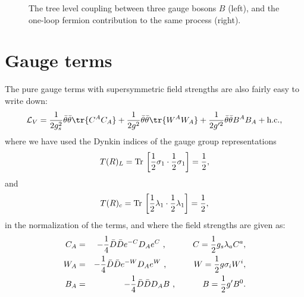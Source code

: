 \documentclass[notes.tex]{subfiles}
\begin{document}

\begin{figure}[h]
\centering
{}
\caption{The tree level coupling between three gauge bosons $B$ (left), and the one-loop fermion contribution to the same process (right).}  
\label{fig:anomaly}
\end{figure}



\section{Gauge terms}
The pure gauge terms with supersymmetric field strengths are also fairly easy to write down:
\begin{eqnarray}\label{eq:gaugelag}
\mathcal{L}_V = \frac{1}{2g_s^2}\bar{\theta}\bar{\theta}\tr{C^AC_A} +\frac{1}{2g^2}\bar{\theta}\bar{\theta}\tr{W^AW_A} +  \frac{1}{2g'^2}\bar{\theta}\bar{\theta}B^AB_A+\text{h.c.},
\end{eqnarray}
where we have used the Dynkin indices of the gauge group representations
\[T(R)_L = {\rm Tr\,}\left[\frac{1}{2}\sigma_1\cdot \frac{1}{2}\sigma_1\right] = \frac{1}{2},\]
and
\[T(R)_c = {\rm Tr\,}\left[\frac{1}{2}\lambda_1\cdot \frac{1}{2}\lambda_1\right] = \frac{1}{2},\]
in the normalization of the terms, and where the field strengths are given as:
\begin{eqnarray}
C_A &=& -\frac{1}{4}\bar{D}\bar{D}e^{-C}D_Ae^C \text{ , \indent \indent}C = \frac{1}{2}g_s \lambda_aC^a,\\
W_A &=& -\frac{1}{4}\bar{D}\bar{D}e^{-W}D_Ae^W \text{ , \indent \indent}W = \frac{1}{2} g \sigma_iW^i,\\
B_A &=& -\frac{1}{4}\bar{D}\bar{D}D_AB \text{ , \indent \indent}B = \frac{1}{2} g' B^0.
\end{eqnarray}
\end{document}
